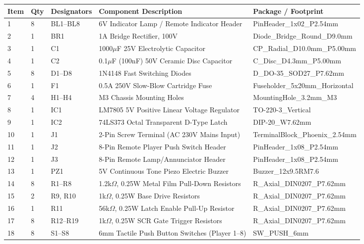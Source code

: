 \documentclass[11pt,a4paper]{article}
\begin{document}
\begin{table}[H]
\centering
\footnotesize
\renewcommand{\arraystretch}{1.2}
\begin{tabularx}{\textwidth}{l l l X l}
\toprule
\textbf{Item} & \textbf{Qty} & \textbf{Designators} & \textbf{Component Description} & \textbf{Package / Footprint} \\
\midrule
1 & 8 & BL1--BL8 & 6V Indicator Lamp / Remote Indicator Header & PinHeader\_1x02\_P2.54mm \\
2 & 1 & BR1 & 1A Bridge Rectifier, 100V & Diode\_Bridge\_Round\_D9.0mm \\
3 & 1 & C1 & 1000$\mu$F 25V Electrolytic Capacitor & CP\_Radial\_D10.0mm\_P5.00mm \\
4 & 1 & C2 & 0.1$\mu$F (100nF) 50V Ceramic Disc Capacitor & C\_Disc\_D4.3mm\_P5.00mm \\
5 & 8 & D1--D8 & 1N4148 Fast Switching Diodes & D\_DO-35\_SOD27\_P7.62mm \\
6 & 1 & F1 & 0.5A 250V Slow-Blow Cartridge Fuse & Fuseholder\_5x20mm\_Horizontal \\
7 & 4 & H1--H4 & M3 Chassis Mounting Holes & MountingHole\_3.2mm\_M3 \\
8 & 1 & IC1 & LM7805 5V Positive Linear Voltage Regulator & TO-220-3\_Vertical \\
9 & 1 & IC2 & 74LS373 Octal Transparent D-Type Latch & DIP-20\_W7.62mm \\
10 & 1 & J1 & 2-Pin Screw Terminal (AC 230V Mains Input) & TerminalBlock\_Phoenix\_2.54mm \\
11 & 1 & J2 & 8-Pin Remote Player Push Switch Header & PinHeader\_1x08\_P2.54mm \\
12 & 1 & J3 & 8-Pin Remote Lamp/Annunciator Header & PinHeader\_1x08\_P2.54mm \\
13 & 1 & PZ1 & 5V Continuous Tone Piezo Electric Buzzer & Buzzer\_12x9.5RM7.6 \\
14 & 8 & R1--R8 & 1.2k$\Omega$, 0.25W Metal Film Pull-Down Resistors & R\_Axial\_DIN0207\_P7.62mm \\
15 & 2 & R9, R10 & 1k$\Omega$, 0.25W Base Drive Resistors & R\_Axial\_DIN0207\_P7.62mm \\
16 & 1 & R11 & 56k$\Omega$, 0.25W Latch Enable Pull-Up Resistor & R\_Axial\_DIN0207\_P7.62mm \\
17 & 8 & R12--R19 & 1k$\Omega$, 0.25W SCR Gate Trigger Resistors & R\_Axial\_DIN0207\_P7.62mm \\
18 & 8 & S1--S8 & 6mm Tactile Push Button Switches (Player 1--8) & SW\_PUSH\_6mm \\

\end{tabularx}
\end{table}
\end{document}
